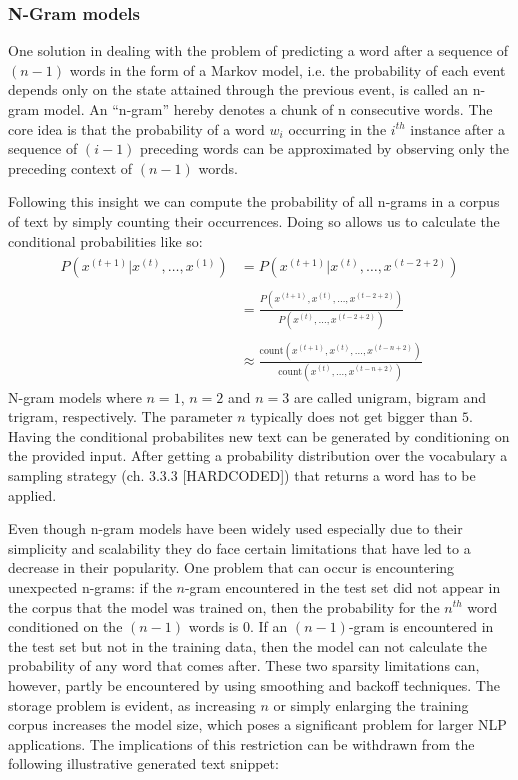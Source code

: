 \subsubsection{N-Gram models}
\label{sub:n_gram_models}

One solution in dealing with the problem of predicting a word after a sequence of $ (n - 1) $ words in the form of a Markov model, i.e. the probability of each event depends only on the state attained through the previous event, is called an n-gram model. An “n-gram” hereby denotes a chunk of n consecutive words. The core idea is that the probability of a word $ w_i $ occurring in the $ i^{th} $ instance after a sequence of $ (i - 1) $ preceding words can be approximated by observing only the preceding context of $ (n - 1) $ words.

Following this insight we can compute the probability of all n-grams in a corpus of text by simply counting their occurrences. Doing so allows us to calculate the conditional probabilities like so:
\begin{align}
    \begin{split}
        P(x^{(t+1)} | x^{(t)}, \dots, x^{(1)}) &= P(x^{(t+1)} | x^{(t)}, \dots, x^{(t - 2 + 2)}) \\ \\
        &= \frac{P(x^{(t+1)}, x^{(t)}, \dots, x^{(t - 2 + 2)})}{P(x^{(t)}, \dots, x^{(t - 2 + 2)})} \\ \\
        &\approx \frac{\text{count}(x^{(t+1)}, x^{(t)}, \dots, x^{(t - n + 2)})}{\text{count}(x^{(t)}, \dots, x^{(t - n + 2)})}
    \end{split}
\end{align}
N-gram models where $ n = 1 $, $ n = 2 $ and $ n = 3 $ are called unigram, bigram and trigram, respectively. The parameter $ n $ typically does not get bigger than $ 5 $. Having the conditional probabilites new text can be generated by conditioning on the provided input. After getting a probability distribution over the vocabulary a sampling strategy (ch. 3.3.3 [HARDCODED]) that returns a word has to be applied.

Even though n-gram models have been widely used especially due to their simplicity and scalability they do face certain limitations that have led to a decrease in their popularity. One problem that can occur is encountering unexpected n-grams: if the $ n $-gram encountered in the test set did not appear in the corpus that the model was trained on, then the probability for the $ n^{th} $ word conditioned on the $ (n-1) $ words is $ 0 $. If an $ (n-1) $-gram is encountered in the test set but not in the training data, then the model can not calculate the probability of any word that comes after. These two sparsity limitations can, however, partly be encountered by using smoothing and backoff techniques. The storage problem is evident, as increasing $ n $ or simply enlarging the training corpus increases the model size, which poses a significant problem for larger NLP applications. The implications of this restriction can be withdrawn from the following illustrative generated text snippet:

